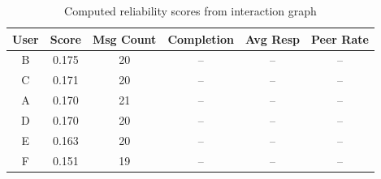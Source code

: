 \begin{table}[H]
\centering
\caption{Computed reliability scores from interaction graph}
\label{tab:results}
\begin{tabular}{cccccc}
\toprule
User & Score & Msg Count & Completion & Avg Resp & Peer Rate \\
\midrule
B & 0.175 & 20 & -- & -- & -- \\
C & 0.171 & 20 & -- & -- & -- \\
A & 0.170 & 21 & -- & -- & -- \\
D & 0.170 & 20 & -- & -- & -- \\
E & 0.163 & 20 & -- & -- & -- \\
F & 0.151 & 19 & -- & -- & -- \\
\bottomrule
\end{tabular}
\end{table}